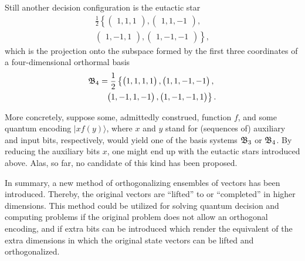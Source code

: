 \documentclass[%
 preprint,
 showpacs,
 showkeys,
 preprintnumbers,
 amsmath,amssymb,
 aps,
  pra,
  longbibliography,
 ]{revtex4-1}
\begin{document}
Still another decision configuration is the eutactic star
\begin{equation}
\begin{aligned}
\frac{1}{2}\left\{
 \begin{pmatrix}1,1,1\end{pmatrix},
 \begin{pmatrix}1,1,-1\end{pmatrix}, \right.\\
 \begin{pmatrix}1,-1,1\end{pmatrix},
\left.
 \begin{pmatrix}1,-1,-1\end{pmatrix}
   \right\} ,
\end{aligned}
\end{equation}
which is the projection onto the subspace formed by the first three coordinates
of a four-dimensional orthormal basis
\begin{equation}
\begin{aligned}
{\frak B}_4 =\frac{1}{2} \left\{
 \begin{pmatrix}1,1,1,1\end{pmatrix},
 \begin{pmatrix}1,1,-1,-1\end{pmatrix}, \right.\\
\left.
 \begin{pmatrix}1,-1,1,-1\end{pmatrix},
 \begin{pmatrix}1,-1,-1,1\end{pmatrix}
   \right\} .
\end{aligned}
\end{equation}

More concretely, suppose some, admittedly construed, function $f$, and some quantum encoding $\vert x f(y) \rangle$,
where $x$ and $y$ stand for (sequences of) auxiliary and input bits, respectively,
would yield one of the basis systems
${\frak B}_3$ or
${\frak B}_4$.
By reducing the auxiliary bits $x$, one might end up with the
eutactic stars introduced above.
Alas, so far, no candidate of this kind has been proposed.




In summary, a new method of orthogonalizing ensembles of vectors
has been introduced.
Thereby, the original vectors are  ``lifted'' to
or ``completed'' in higher dimensions.
This method could be utilized for solving quantum decision and computing problems
if the original problem does not allow an orthogonal encoding,
and if extra bits can be introduced which render the equivalent of the extra dimensions
in which the original state vectors can be lifted and orthogonalized.
\end{document}
